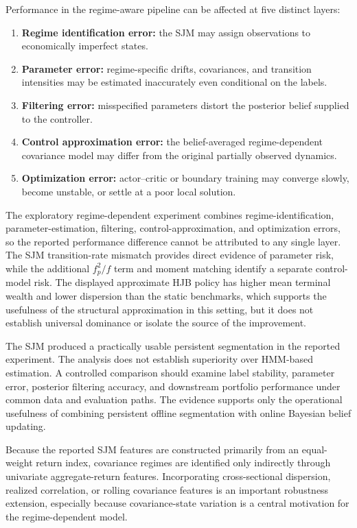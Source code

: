 \documentclass[a4paper,10pt]{article}
\begin{document}
Performance in the regime-aware pipeline can be affected at five distinct layers:
\begin{enumerate}[label=(\arabic*)]
\item \textbf{Regime identification error:} the SJM may assign observations to economically imperfect states.
\item \textbf{Parameter error:} regime-specific drifts, covariances, and transition intensities may be estimated inaccurately even conditional on the labels.
\item \textbf{Filtering error:} misspecified parameters distort the posterior belief supplied to the controller.
\item \textbf{Control approximation error:} the belief-averaged regime-dependent covariance model may differ from the original partially observed dynamics.
\item \textbf{Optimization error:} actor--critic or boundary training may converge slowly, become unstable, or settle at a poor local solution.
\end{enumerate}
The exploratory regime-dependent experiment combines regime-identification, parameter-estimation, filtering, control-approximation, and optimization errors, so the reported performance difference cannot be attributed to any single layer. The SJM transition-rate mismatch provides direct evidence of parameter risk, while the additional $f_p^2/f$ term and moment matching identify a separate control-model risk. The displayed approximate HJB policy has higher mean terminal wealth and lower dispersion than the static benchmarks, which supports the usefulness of the structural approximation in this setting, but it does not establish universal dominance or isolate the source of the improvement.

The SJM produced a practically usable persistent segmentation in the reported experiment. The analysis does not establish superiority over HMM-based estimation. A controlled comparison should examine label stability, parameter error, posterior filtering accuracy, and downstream portfolio performance under common data and evaluation paths. The evidence supports only the operational usefulness of combining persistent offline segmentation with online Bayesian belief updating.

Because the reported SJM features are constructed primarily from an equal-weight return index, covariance regimes are identified only indirectly through univariate aggregate-return features. Incorporating cross-sectional dispersion, realized correlation, or rolling covariance features is an important robustness extension, especially because covariance-state variation is a central motivation for the regime-dependent model.
\end{document}
